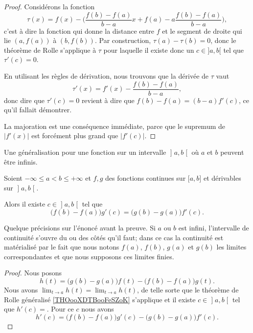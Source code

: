 \begin{proof}
    Considérons la fonction
    \begin{equation}
        \tau(x)=f(x)-\big( \frac{ f(b)-f(a) }{ b-a }x + f(a) - a\frac{ f(b)-f(a) }{ b-a } \big),
    \end{equation}
    c'est à dire la fonction qui donne la distance entre $f$ et le segment de droite qui lie $(a,f(a))$ à $(b,f(b))$. Par construction, $\tau(a)-\tau(b)=0$, donc le théorème de Rolle s'applique à $\tau$ pour laquelle il existe donc un $c\in]a,b[$ tel que $\tau'(c)=0$.

    En utilisant les règles de dérivation, nous trouvons que la dérivée de $\tau$ vaut
    \begin{equation}
        \tau'(x)= f'(x)-\frac{ f(b)-f(a) }{ b-a },
    \end{equation}
    donc dire que $\tau'(c)=0$ revient à dire que $f(b)-f(a)=(b-a)f'(c)$, ce qu'il fallait démontrer.

    La majoration est une conséquence immédiate, parce que le supremum de \( | f'(x) |\) est forcément plus grand que \( | f'(c) |\).
\end{proof}

Une généralisation pour une fonction sur un intervalle \( \mathopen] a , b \mathclose[\) où \( a\) et \( b\) peuvent être infinis.
\begin{theorem} \label{THOooRIIBooOjkzMa}
    Soient \( -\infty\leq a<b\leq +\infty\) et \( f,g\) des fonctions continues sur \( \mathopen[ a , b \mathclose]\) et dérivables sur \( \mathopen] a , b \mathclose[\).

    Alors il existe \( c\in \mathopen] a , b \mathclose[\) tel que
        \begin{equation}
            \big( f(b)-f(a) \big)g'(c)=\big( g(b)-g(a) \big)f'(c).
        \end{equation}

\end{theorem}

Quelque précisions sur l'énoncé avant la preuve.  Si \( a\) ou \( b\) est infini, l'intervalle de continuité s'ouvre du ou des côtés qu'il faut; dans ce cas la continuité est matérialisé par le fait que nous notons \( f(a)\), \( f(b)\), \( g(a)\) et \( g(b)\) les limites correspondantes et que nous supposons ces limites finies.

\begin{proof}
    Nous posons
    \begin{equation}
        h(t)=\big( g(b)-g(a) \big)f(t)-\big( f(b)-f(a) \big)g(t).
    \end{equation}
Nous avons \( \lim_{t\to a} h(t)=\lim_{t\to a} h(t)\), de telle sorte que le théorème de Rolle généralisé \ref{THOooXDTBooFeSZoK} s'applique et il existe \( c\in \mathopen] a , b \mathclose[\) tel que \( h'(c)=\). Pour ce \( c\) nous avons
        \begin{equation}
            h'(c)=\big( f(b)-f(a) \big)g'(c)-\big( g(b)-g(a) \big)f'(c).
        \end{equation}
\end{proof}

